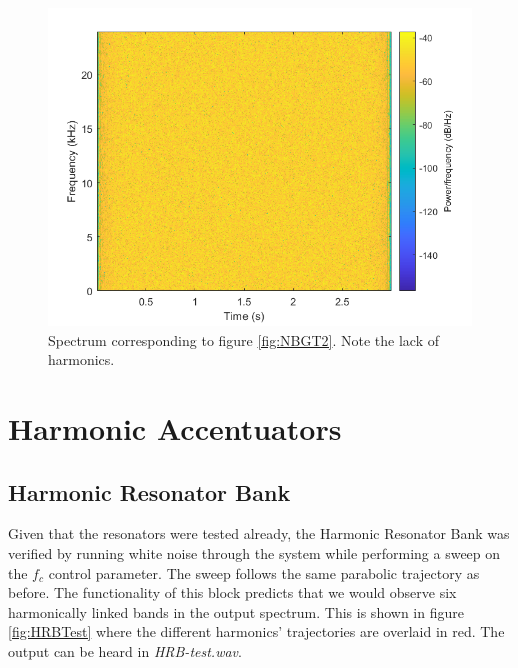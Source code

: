 \documentclass[../main.tex]{subfiles}
\begin{document}
\begin{figure}[h]
    \centering
    \includegraphics[scale=.65]{./images/plots/NBGTest2Spectrum.png}
    \caption{Spectrum corresponding to figure \ref{fig:NBGT2}. Note the lack of harmonics.}
    \label{fig:NBGT2Spec}
\end{figure}

\clearpage

\section{Harmonic Accentuators}
\subsection{Harmonic Resonator Bank}
Given that the resonators were tested already, the Harmonic Resonator Bank was verified by running white noise through the system while performing a sweep on the $f_c$ control parameter. The sweep follows the same parabolic trajectory as before. The functionality of this block predicts that we would observe six harmonically linked bands in the output spectrum. This is shown in figure \ref{fig:HRBTest} where the different harmonics' trajectories are overlaid in red. The output can be heard in \emph{HRB-test.wav}.
\end{document}
